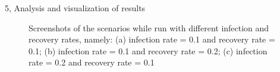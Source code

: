 \documentclass[10pt,a4paper]{article}
\begin{document}
\begin{task}{5, Analysis and visualization of results}
\begin{figure}[H]
    \centering
    \hfill
    \hfill
    \caption{Screenshots of the scenarios while run with different infection and recovery rates, namely:
    (a) infection rate = 0.1 and recovery rate = 0.1;
    (b) infection rate = 0.1 and recovery rate = 0.2;
    (c) infection rate = 0.2 and recovery rate = 0.1}
    \label{fig:inf-rec-rates-screenshots}
\end{figure}


\end{task}
\end{document}
